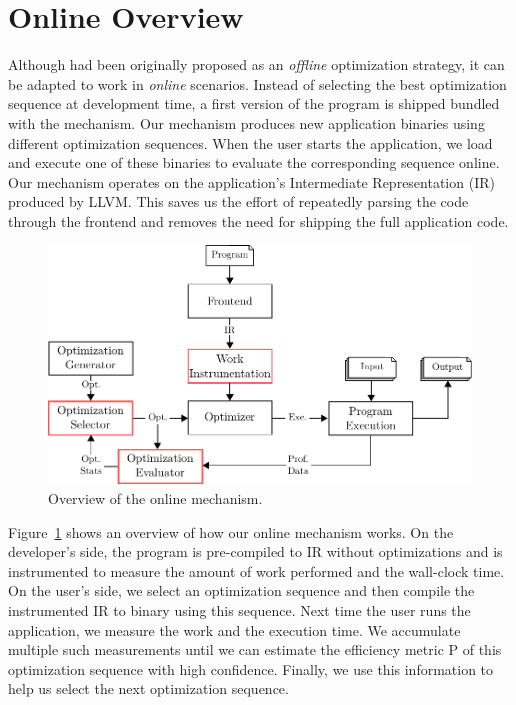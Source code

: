 \section{Online {\IterComp} Overview} \label{sec:oic-infra}

Although {\itercomp} had been originally proposed as an \textit{offline} optimization strategy, it can be adapted to work in
\textit{online} scenarios. Instead of selecting the best optimization sequence at development time, a first version of the program is
shipped bundled with the {\itercomp} mechanism. Our mechanism produces new application binaries using different optimization sequences.
When the user starts the application, we load and execute one of these binaries to evaluate the corresponding sequence online. Our
mechanism operates on the application's Intermediate Representation (IR) produced by LLVM. This saves us the effort of repeatedly parsing
the code through the frontend and removes the need for shipping the full application code.

\begin{figure}[htb]
    \centering
    \includegraphics[width=\linewidth]{figs/infra-diagram}
    \caption{Overview of the online \itercomp mechanism.}
    \label{fig:infra-diagram}
\end{figure}

Figure~\ref{fig:infra-diagram} shows an overview of how our online {\itercomp} mechanism works. On the developer's side, the program is
pre-compiled to IR without optimizations and is instrumented to measure the amount of work performed and the wall-clock time. On the user's
side, we select an optimization sequence and then compile the instrumented IR to binary using this sequence. Next time the user runs the
application, we measure the work and the execution time. We accumulate multiple such measurements until we can estimate the efficiency
metric P of this optimization sequence with high confidence. Finally, we use this information to help us select the next optimization
sequence.

